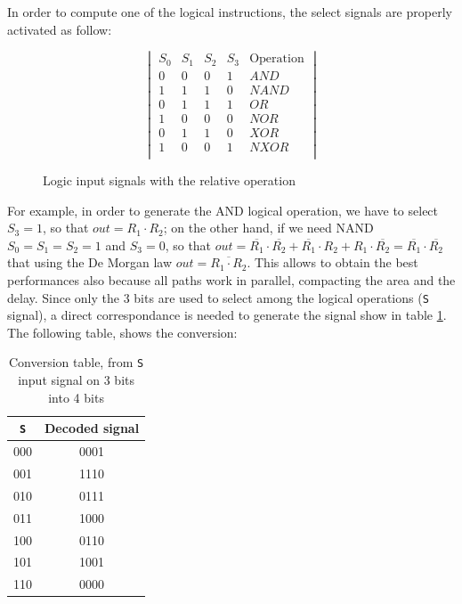 	In order to compute one of the logical instructions, the select signals are properly activated as follow:
	
	\begin{figure}[ht]
		\centering
	\[
	\begin{vmatrix}
		S_0 & S_1 & S_2 & S_3 & \text{Operation}\\
		0 & 0 & 0 & 1 & AND \\
		1 & 1 & 1 & 0 & NAND \\
		0 & 1 & 1 & 1 & OR \\
		1 & 0 & 0 & 0 & NOR \\
		0 & 1 & 1 & 0 & XOR \\
		1 & 0 & 0 & 1 & NXOR \\
	\end{vmatrix}
	\]
	  \caption{Logic input signals with the relative operation}
	  \label{tab:log_sign}
\end{figure}
	
	For example, in order to generate the AND logical operation, we have to select $S_3 = 1$, so that $out = R_1 \cdot R_2$; on the other hand, if we need NAND $S_0 = S_1 = S_2 = 1$ and $S_3 = 0$, so that $out = \overline{R_1} \cdot \overline{R_2} + \overline{R_1} \cdot R_2 + R_1 \cdot \overline{R_2} = \overline{R_1} \cdot \overline{R_2}$ that using the De Morgan law $out = \overline{R_1 \cdot R_2}$.
	This allows to obtain the best performances also because all paths work in parallel, compacting the area and the delay.\newline\newline
	Since only the 3 bits are used to select among the logical operations (\texttt{S} signal), a direct correspondance is needed to generate the signal show in table \ref{tab:log_sign}. The following table, shows the conversion:
	\begin{table}[H]
		\begin{center}
			\begin{tabular}{ c| c}
				\texttt{S} & Decoded signal \\
				\hline
				000 & 0001 \\
				001 & 1110 \\
				010 & 0111 \\
				011 & 1000 \\
				100 & 0110 \\ 
				101 & 1001 \\ 
				110 & 0000 \\ 
				
			\end{tabular}
			\caption{Conversion table, from \texttt{S} input signal on 3 bits into 4 bits}
		\end{center}
	\end{table}

